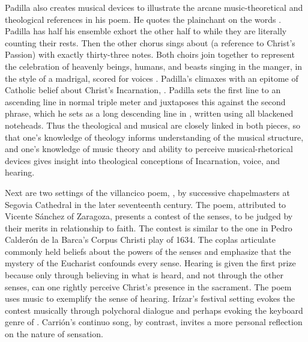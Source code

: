Padilla also creates musical devices to illustrate the arcane music-theoretical 
and theological references in his poem.
He quotes the plainchant  on the words .
Padilla has half his ensemble exhort the other half to  while they are literally counting their rests.
Then the other chorus sings about  (a 
reference to Christ's Passion) with exactly thirty-three notes.
Both choirs join together to represent the celebration of heavenly beings, 
humans, and beasts singing in the manger, in the style of a madrigal, scored 
for voices .
Padilla's  climaxes with an epitome of Catholic belief about
Christ's Incarnation, .
Padilla sets the first line to an ascending line in normal triple meter and 
juxtaposes this against the second phrase, which he sets as a long descending 
line in , written using all blackened noteheads.
Thus the theological and musical are closely linked in both pieces, so that 
one's knowledge of theology informs understanding of the musical structure, and 
one's knowledge of music theory and ability to perceive musical-rhetorical 
devices gives insight into theological conceptions of Incarnation, voice, and
hearing.


Next are two settings of the villancico poem, , by successive chapelmasters at Segovia Cathedral in the 
later seventeenth century.%
    \Autocite[285--338]{Cashner:PhD}
The poem, attributed to Vicente Sánchez of Zaragoza, presents a contest 
of the senses, to be judged by their merits in relationship to faith.
The contest is similar to the one in Pedro Calderón de la Barca's Corpus Christi 
play  of 1634.%
    \Autocites{Calderon:Retiro}[52--107]{Cashner:PhD}
The coplas articulate commonly held beliefs about the powers of the senses and 
emphasize that the mystery of the Eucharist confounds every sense.
Hearing is given the first prize because only through believing in what is 
heard, and not through the other senses, can one rightly perceive Christ's 
presence in the sacrament.
The poem uses music to exemplify the sense of hearing.
Irízar's festival setting evokes the contest musically through polychoral
dialogue and perhaps evoking the keyboard genre of .
Carrión's continuo song, by contrast, invites a more personal reflection on the 
nature of sensation.

